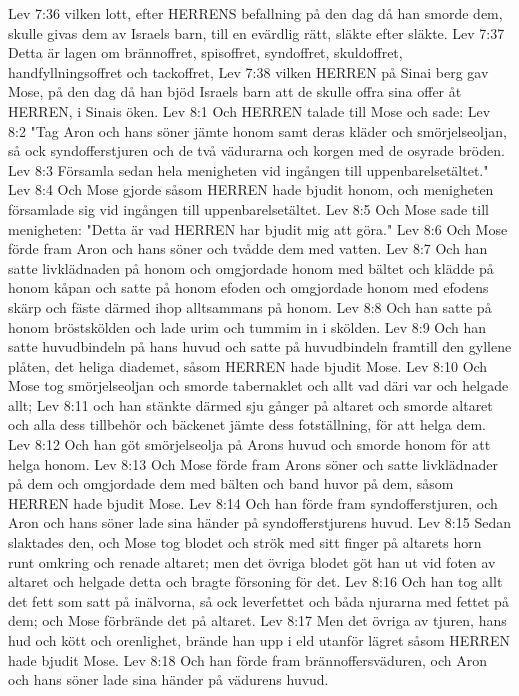 Lev 7:36  vilken lott, efter HERRENS befallning på den dag då han smorde dem, skulle givas dem av Israels barn, till en evärdlig rätt, släkte efter släkte.
Lev 7:37  Detta är lagen om brännoffret, spisoffret, syndoffret, skuldoffret, handfyllningsoffret och tackoffret,
Lev 7:38  vilken HERREN på Sinai berg gav Mose, på den dag då han bjöd Israels barn att de skulle offra sina offer åt HERREN, i Sinais öken.
Lev 8:1  Och HERREN talade till Mose och sade:
Lev 8:2  "Tag Aron och hans söner jämte honom samt deras kläder och smörjelseoljan, så ock syndofferstjuren och de två vädurarna och korgen med de osyrade bröden.
Lev 8:3  Församla sedan hela menigheten vid ingången till uppenbarelsetältet."
Lev 8:4  Och Mose gjorde såsom HERREN hade bjudit honom, och menigheten församlade sig vid ingången till uppenbarelsetältet.
Lev 8:5  Och Mose sade till menigheten: "Detta är vad HERREN har bjudit mig att göra."
Lev 8:6  Och Mose förde fram Aron och hans söner och tvådde dem med vatten.
Lev 8:7  Och han satte livklädnaden på honom och omgjordade honom med bältet och klädde på honom kåpan och satte på honom efoden och omgjordade honom med efodens skärp och fäste därmed ihop alltsammans på honom.
Lev 8:8  Och han satte på honom bröstskölden och lade urim och tummim in i skölden.
Lev 8:9  Och han satte huvudbindeln på hans huvud och satte på huvudbindeln framtill den gyllene plåten, det heliga diademet, såsom HERREN hade bjudit Mose.
Lev 8:10  Och Mose tog smörjelseoljan och smorde tabernaklet och allt vad däri var och helgade allt;
Lev 8:11  och han stänkte därmed sju gånger på altaret och smorde altaret och alla dess tillbehör och bäckenet jämte dess fotställning, för att helga dem.
Lev 8:12  Och han göt smörjelseolja på Arons huvud och smorde honom för att helga honom.
Lev 8:13  Och Mose förde fram Arons söner och satte livklädnader på dem och omgjordade dem med bälten och band huvor på dem, såsom HERREN hade bjudit Mose.
Lev 8:14  Och han förde fram syndofferstjuren, och Aron och hans söner lade sina händer på syndofferstjurens huvud.
Lev 8:15  Sedan slaktades den, och Mose tog blodet och strök med sitt finger på altarets horn runt omkring och renade altaret; men det övriga blodet göt han ut vid foten av altaret och helgade detta och bragte försoning för det.
Lev 8:16  Och han tog allt det fett som satt på inälvorna, så ock leverfettet och båda njurarna med fettet på dem; och Mose förbrände det på altaret.
Lev 8:17  Men det övriga av tjuren, hans hud och kött och orenlighet, brände han upp i eld utanför lägret såsom HERREN hade bjudit Mose.
Lev 8:18  Och han förde fram brännoffersväduren, och Aron och hans söner lade sina händer på vädurens huvud.
